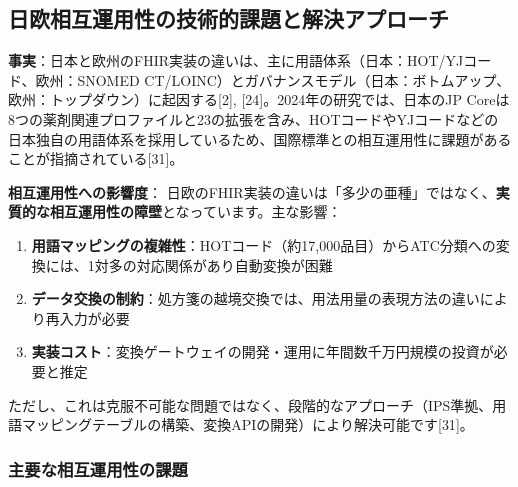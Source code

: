 \documentclass[
  a4paper,
  a4paper,
  11pt]{ltjsbook}
\providecommand{\tightlist}{%
  \setlength{\itemsep}{0pt}\setlength{\parskip}{0pt}}
\begin{document}
\subsection{日欧相互運用性の技術的課題と解決アプローチ}\label{ux65e5ux6b27ux76f8ux4e92ux904bux7528ux6027ux306eux6280ux8853ux7684ux8ab2ux984cux3068ux89e3ux6c7aux30a2ux30d7ux30edux30fcux30c1}

\textbf{事実}：日本と欧州のFHIR実装の違いは、主に用語体系（日本：HOT/YJコード、欧州：SNOMED
CT/LOINC）とガバナンスモデル（日本：ボトムアップ、欧州：トップダウン）に起因する{[}2{]},
{[}24{]}。2024年の研究では、日本のJP
Coreは8つの薬剤関連プロファイルと23の拡張を含み、HOTコードやYJコードなどの日本独自の用語体系を採用しているため、国際標準との相互運用性に課題があることが指摘されている{[}31{]}。

\begin{tcolorbox}[enhanced jigsaw, toprule=.15mm, bottomtitle=1mm, coltitle=black, left=2mm, opacityback=0, arc=.35mm, colbacktitle=quarto-callout-warning-color!10!white, colback=white, opacitybacktitle=0.6, bottomrule=.15mm, rightrule=.15mm, breakable, title=\textcolor{quarto-callout-warning-color}{\faExclamationTriangle}\hspace{0.5em}{Warning}, toptitle=1mm, titlerule=0mm, colframe=quarto-callout-warning-color-frame, leftrule=.75mm]

\textbf{相互運用性への影響度}：
日欧のFHIR実装の違いは「多少の亜種」ではなく、\textbf{実質的な相互運用性の障壁}となっています。主な影響：

\begin{enumerate}
\def\labelenumi{\arabic{enumi}.}
\tightlist
\item
  \textbf{用語マッピングの複雑性}：HOTコード（約17,000品目）からATC分類への変換には、1対多の対応関係があり自動変換が困難
\item
  \textbf{データ交換の制約}：処方箋の越境交換では、用法用量の表現方法の違いにより再入力が必要
\item
  \textbf{実装コスト}：変換ゲートウェイの開発・運用に年間数千万円規模の投資が必要と推定
\end{enumerate}

ただし、これは克服不可能な問題ではなく、段階的なアプローチ（IPS準拠、用語マッピングテーブルの構築、変換APIの開発）により解決可能です{[}31{]}。

\end{tcolorbox}

\subsubsection{主要な相互運用性の課題}\label{ux4e3bux8981ux306aux76f8ux4e92ux904bux7528ux6027ux306eux8ab2ux984c}
\end{document}
